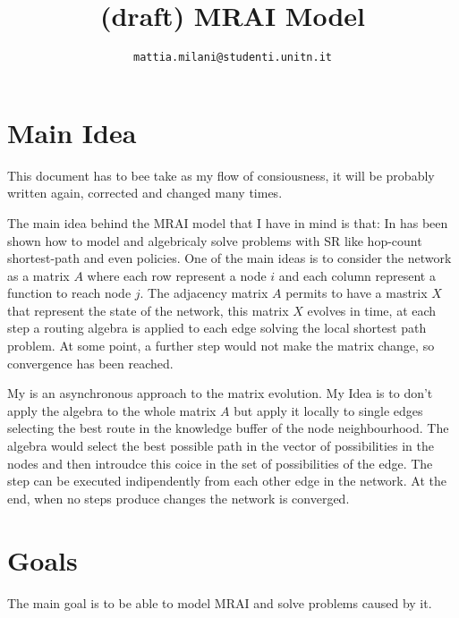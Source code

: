 \documentclass[10pt,conference,letterpaper]{IEEEtran}
\theoremstyle{definition}
\theoremstyle{remark}
\begin{document}
\title{(draft) MRAI Model}
\author{
    \texttt{mattia.milani@studenti.unitn.it}
}


\maketitle

\section{Main Idea}
\label{sec:mainIdea}

This document has to bee take as my flow of consiousness, it will be
probably written again, corrected and changed many times.

The main idea behind the \ac{MRAI} model that I have in mind is that: 
In \cite{daggitt2018rate} has been shown how to model and algebricaly solve
problems with \ac{SR} like hop-count shortest-path and even policies.
One of the main ideas is to consider the network as a matrix $A$ where each
row represent a node $i$ and each column represent a function to reach node
$j$.
The adjacency matrix $A$ permits to have a mastrix $X$ that represent the state of
the network, this matrix $X$ evolves in time, at each step a routing algebra is applied to each
edge solving the local shortest path problem.
At some point, a further step would not make the matrix change, so convergence
has been reached.

My is an asynchronous approach to the matrix evolution.
My Idea is to don't apply the algebra to the whole matrix $A$ but apply it
locally to single edges selecting the best route in the knowledge buffer
of the node neighbourhood.
The algebra would select the best possible path in the vector of possibilities
in the nodes and then introudce this coice in the set of possibilities of 
the edge.
The step can be executed indipendently from each other edge in the network.
At the end, when no steps produce changes the network is converged.

\section{Goals}
\label{sec:goals}

The main goal is to be able to model \ac{MRAI} and solve problems caused by it.
\end{document}
